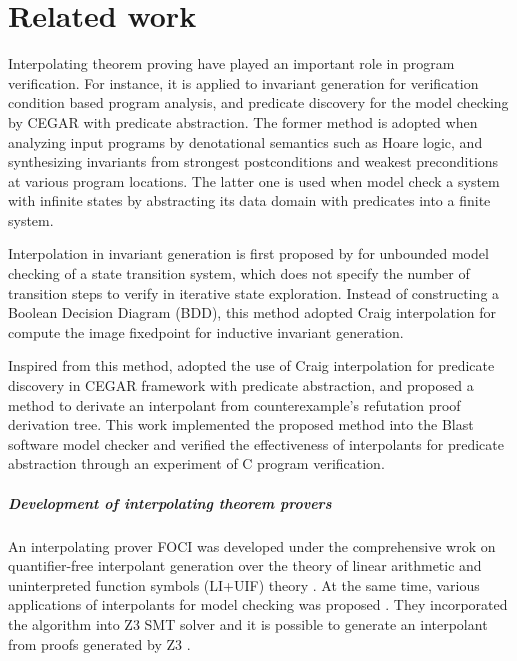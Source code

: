 \chapter{Related work}
\label{chap:related}

Interpolating theorem proving have played an important role in program
verification.  For instance, it is applied to invariant generation for
verification condition based program analysis, and predicate discovery
for the model checking by CEGAR with predicate abstraction.  The
former method is adopted when analyzing input programs by denotational
semantics such as Hoare logic, and synthesizing invariants from
strongest postconditions and weakest preconditions at various program
locations.  The latter one is used when model check a system with
infinite states by abstracting its data domain with predicates into a
finite system.

Interpolation in invariant generation is first proposed
by \cite{conf/cav/McMillan03} for unbounded model checking of a state
transition system, which does not specify the number of transition
steps to verify in iterative state exploration.  Instead of
constructing a Boolean Decision Diagram (BDD), this method adopted
Craig interpolation for compute the image fixedpoint for inductive
invariant generation.

Inspired from this method, \cite{conf/popl/HenzingerJMM04} adopted the
use of Craig interpolation for predicate discovery in CEGAR framework
with predicate abstraction, and proposed a method to derivate an
interpolant from counterexample's refutation proof derivation tree.
This work implemented the proposed method into the Blast software
model checker \cite{conf/popl/HenzingerJMS02,journals/sttt/BeyerHJM07}
and verified the effectiveness of interpolants for predicate
abstraction through an experiment of C program verification.

\paragraph{Development of interpolating theorem provers}
An interpolating prover \textsc{FOCI} \cite{website/foci} was
developed under the comprehensive wrok on quantifier-free interpolant
generation over the theory of linear arithmetic and uninterpreted
function symbols (LI+UIF) theory \cite{journals/tcs/McMillan05}.  At the same
time, various applications of interpolants for model checking was
proposed \cite{conf/tacas/McMillan05}. They incorporated the algorithm
into Z3 SMT solver \cite{conf/tacas/MouraB08} and it is possible to
generate an interpolant from proofs generated by
Z3 \cite{conf/fmcad/McMillan11}.


